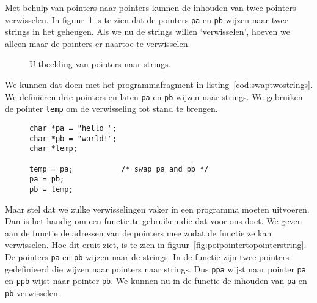 Met behulp van pointers naar pointers kunnen de inhouden van twee pointers verwisselen. In figuur~\ref{fig:poipointertostring} is te zien dat de pointers \texttt{pa} en \texttt{pb} wijzen naar twee strings in het geheugen. Als we nu de strings willen `verwisselen', hoeven we alleen maar de pointers er naartoe te verwisselen.

\begin{figure}[!ht]
\centering
{}
\caption{Uitbeelding van pointers naar strings.}
\label{fig:poipointertostring}
\end{figure}

We kunnen dat doen met het programmafragment in listing~\ref{cod:swaptwostrings}. We definiëren drie pointers en laten \texttt{pa} en \texttt{pb} wijzen naar strings. We gebruiken de pointer \texttt{temp} om de verwisseling tot stand te brengen.

\begin{figure}[!ht]
\begin{lstlisting}[caption=Verwisselen van twee pointers.,label=cod:swaptwostrings]
char *pa = "hello ";
char *pb = "world!";
char *temp;

temp = pa;           /* swap pa and pb */
pa = pb;
pb = temp;
\end{lstlisting}
\end{figure}

Maar stel dat we zulke verwisselingen vaker in een programma moeten uitvoeren. Dan is het handig om een functie te gebruiken die dat voor ons doet. We geven aan de functie de adressen van de pointers mee zodat de functie ze kan verwisselen. Hoe dit eruit ziet, is te zien in figuur~\ref{fig:poipointertopointerstring}. De pointers \texttt{pa} en \texttt{pb} wijzen naar de strings. In de functie zijn twee pointers gedefinieerd die wijzen naar pointers naar strings. Dus \texttt{ppa} wijst naar pointer \texttt{pa} en \texttt{ppb} wijst naar pointer \texttt{pb}. We kunnen nu in de functie de inhouden van \texttt{pa} en \texttt{pb} verwisselen.

